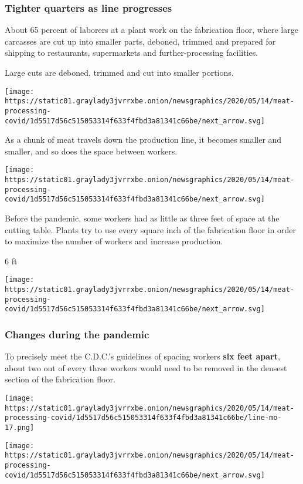 \hypertarget{tighter-quarters-as-line-progresses}{%
\subsubsection{Tighter quarters as line
progresses}\label{tighter-quarters-as-line-progresses}}

About 65 percent of laborers at a plant work on the fabrication floor,
where large carcasses are cut up into smaller parts, deboned, trimmed
and prepared for shipping to restaurants, supermarkets and
further-processing facilities.

Large cuts are deboned, trimmed and cut into smaller portions.

\texttt{[image: https://static01.graylady3jvrrxbe.onion/newsgraphics/2020/05/14/meat-processing-covid/1d5517d56c515053314f633f4fbd3a81341c66be/next\_arrow.svg]}

As a chunk of meat travels down the production line, it becomes smaller
and smaller, and so does the space between workers.

\texttt{[image: https://static01.graylady3jvrrxbe.onion/newsgraphics/2020/05/14/meat-processing-covid/1d5517d56c515053314f633f4fbd3a81341c66be/next\_arrow.svg]}

Before the pandemic, some workers had as little as three feet of space
at the cutting table. Plants try to use every square inch of the
fabrication floor in order to maximize the number of workers and
increase production.

6 ft

\texttt{[image: https://static01.graylady3jvrrxbe.onion/newsgraphics/2020/05/14/meat-processing-covid/1d5517d56c515053314f633f4fbd3a81341c66be/next\_arrow.svg]}

\hypertarget{changes-during-the-pandemic}{%
\subsubsection{Changes during the
pandemic}\label{changes-during-the-pandemic}}

To precisely meet the C.D.C.'s guidelines of spacing workers \textbf{six
feet apart}, about two out of every three workers would need to be
removed in the densest section of the fabrication floor.

\texttt{[image: https://static01.graylady3jvrrxbe.onion/newsgraphics/2020/05/14/meat-processing-covid/1d5517d56c515053314f633f4fbd3a81341c66be/line-mo-17.png]}

\texttt{[image: https://static01.graylady3jvrrxbe.onion/newsgraphics/2020/05/14/meat-processing-covid/1d5517d56c515053314f633f4fbd3a81341c66be/next\_arrow.svg]}

